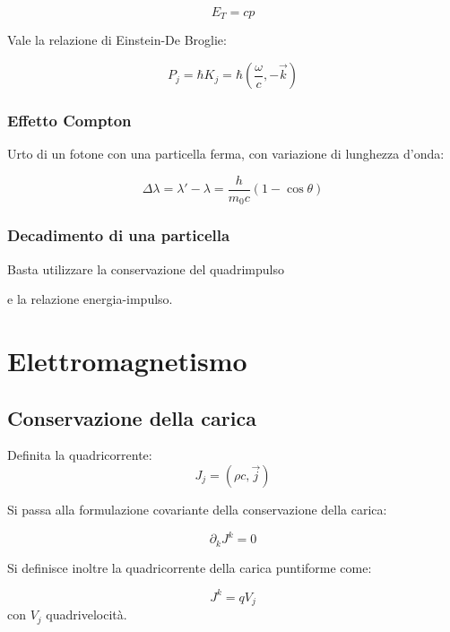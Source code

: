 \documentclass{article}
\begin{document}
\begin{equation}
    E_T=cp
\end{equation}

Vale la relazione di Einstein-De Broglie:

\begin{equation}
    P_j=\hbar K_j=\hbar (\frac{\omega}{c},-\vec{k})
\end{equation}

\subsubsection{Effetto Compton}
Urto di un fotone con una particella ferma, con variazione di lunghezza d'onda:

\begin{equation}
    \Delta \lambda = \lambda' - \lambda = \frac{h}{m_0c}(1-\cos \theta)
\end{equation}

\subsubsection{Decadimento di una particella}

Basta utilizzare la conservazione del quadrimpulso

e la relazione energia-impulso.

\section{Elettromagnetismo}

\subsection{Conservazione della carica}
Definita la quadricorrente:
\begin{equation}
    J_j=(\rho c, \vec{j})
\end{equation}

Si passa alla formulazione covariante della conservazione della carica:

\begin{equation}
   \partial _k J^k=0
\end{equation}

Si definisce inoltre la quadricorrente della carica puntiforme come:

\begin{equation}
    J^k=qV_j
\end{equation}
con $V_j$ quadrivelocità.
\end{document}
